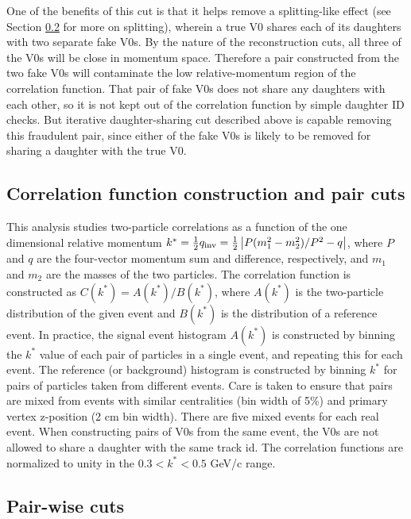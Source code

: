 
One of the benefits of this cut is that it helps remove a splitting-like effect (see Section \ref{sec:PairWiseCuts} for more on splitting), wherein a true V0 shares each of its daughters with two separate fake V0s.  By the nature of the reconstruction cuts, all three of the V0s will be close in momentum space.  Therefore a pair constructed from the two fake V0s will contaminate the low relative-momentum region of the correlation function.  That pair of fake V0s does not share any daughters with each other, so it is not kept out of the correlation function by simple daughter ID checks.  But iterative daughter-sharing cut described above is capable removing this fraudulent pair, since either of the fake V0s is likely to be removed for sharing a daughter with the true V0.


\subsection{Correlation function construction and pair cuts}
\label{sec:CFconstruct}

This analysis studies two-particle correlations as a function of the one dimensional relative momentum $k^*=\frac{1}{2}q_{\mathrm{inv}}=\frac{1}{2}\left\lvert P(m^2_1-m^2_2)/P^2 - q\right\rvert$, where $P$ and $q$ are the four-vector momentum sum and difference, respectively, and $m_1$ and $m_2$ are the masses of the two particles.  The correlation function is constructed as $C(k^*) = A(k^*)/B(k^*)$, where $A(k^*)$ is the two-particle distribution of the given event and $B(k^*)$ is the distribution of a reference event.  In practice, the signal event histogram $A(k^*)$ is constructed by binning the $k^*$ value of each pair of particles in a single event, and repeating this for each event.  The reference (or background) histogram is constructed by binning $k^*$ for pairs of particles taken from different events.  Care is taken to ensure that pairs are mixed from events with similar centralities (bin width of 5\%) and primary vertex z-position (2 cm bin width).  There are five mixed events for each real event.  When constructing pairs of V0s from the same event, the V0s are not allowed to share a daughter with the same track id. The correlation functions are normalized to unity in the $ 0.3 < k^* < 0.5$ GeV/c range.

\subsection{Pair-wise cuts}
\label{sec:PairWiseCuts}

